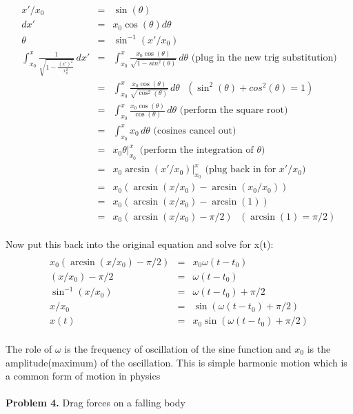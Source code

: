 \documentclass[11pt]{amsart}
\begin{document}
\begin{eqnarray*} 
x'/x_{0} &=& \sin(\theta) \\
dx' &=& x_{0}\cos(\theta)d\theta \\
\theta &=& \sin^{-1}(x'/x_{0}) \\
\int^{x}_{x_{0}}\frac{1}{\sqrt{1 - \frac{(x')^{2}}{x_{0}^{2}}}}\,dx' &=& \int^{x}_{x_{0}}\frac{x_{0}\cos(\theta)}{\sqrt{1 - sin^{2}(\theta)}}\,d\theta  \mbox{ (plug in the new trig substitution)} \\
&=& \int^{x}_{x_{0}}\frac{x_{0}\cos(\theta)}{\sqrt{\cos^{2}(\theta)}}\,d\theta \mbox{ }(\sin^{2}(\theta) + cos^{2}(\theta) = 1)\\
&=& \int^{x}_{x_{0}}\frac{x_{0}\cos(\theta)}{\cos(\theta)}\,d\theta \mbox{ (perform the square root)} \\
&=& \int^{x}_{x_{0}}x_{0}\,d\theta \mbox{ (cosines cancel out)} \\
&=& x_{0}\theta|^{x}_{x_{0}}  \mbox{ (perform the integration of $\theta$)} \\ 
&=& x_{0}\arcsin(x'/x_{0})|^{x}_{x_{0}} \mbox{ (plug back in for $x'/x_{0}$)} \\
&=& x_{0}(\arcsin(x/x_{0}) - \arcsin(x_{0}/x_{0})) \\ 
&=&  x_{0}(\arcsin(x/x_{0}) - \arcsin(1)) \\ 
&=&  x_{0}(\arcsin(x/x_{0}) - \pi/2) \mbox{ }(\arcsin(1) = \pi/2)
\end{eqnarray*}  \\
Now put this back into the original equation and solve for x(t): \\ 
\begin{eqnarray*} \\
 x_{0}(\arcsin(x/x_{0}) - \pi/2) &=& x_{0}\omega{}(t-t_{0}) \\
(x/x_{0}) - \pi/2 &=& \omega{}(t-t_{0}) \\
\sin^{-1}(x/x_{0}) &=& \omega(t-t_{0}) + \pi/2 \\
x/x_{0} &=& \sin(\omega(t-t_{0}) + \pi/2) \\
x(t) &=& x_{0}\sin(\omega(t-t_{0}) + \pi/2)  
\end{eqnarray*} \\
The role of $\omega$ is the frequency of oscillation of the sine function and $x_{0}$ is the amplitude(maximum) of the oscillation. This is simple harmonic motion which is a common form of motion in physics  \\ \\
\newpage
\textbf{Problem 4.} Drag forces on a falling body \\ \\
\end{document}
